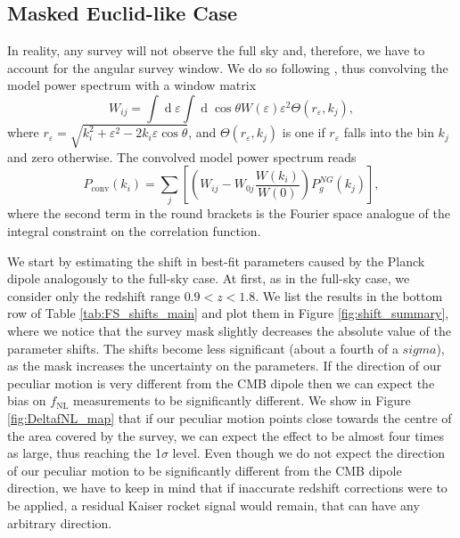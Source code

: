 \documentclass[a4paper,11pt]{article}
\renewcommand{\d}{\operatorname{d}}
\begin{document}
\subsection{Masked Euclid-like Case}
In reality, any survey will not observe the full sky and, therefore, we have to account for the angular survey window. We do so following \cite{Ross:2012sx}, thus convolving the model power spectrum with a window matrix 
\begin{equation}
    W_{ij} = \int\d\varepsilon\int\d\cos\theta W(\varepsilon)\varepsilon^2 \Theta(r_\varepsilon, k_j ),
\end{equation}
where $r_\varepsilon=\sqrt{k_i^2+\varepsilon^2-2k_i\varepsilon\cos\theta}$, and $\Theta(r_\varepsilon, k_j )$ is one if $r_\varepsilon$ falls into the bin $k_j$ and zero otherwise. The convolved model power spectrum reads
\begin{equation}
    P_\mathrm{conv}(k_i)=\sum_j \left[\left(W_{ij}-W_{0j}\frac{W(k_i)}{W(0)} \right)P_g^{NG}(k_j)\right],
\end{equation}
where the second term in the round brackets is the Fourier space analogue of the integral constraint on the correlation function.

We start by estimating the shift in best-fit parameters caused by the Planck dipole analogously to the full-sky case. At first, as in the full-sky case, we consider only the redshift range $0.9<z<1.8$. We list the results in the bottom row of Table \ref{tab:FS_shifts_main} and plot them in Figure \ref{fig:shift_summary}, where we  notice that the survey mask slightly decreases the absolute value of the parameter shifts. The shifts become less significant (about a fourth of a $sigma$), as the mask increases the uncertainty on the parameters.  
If the direction of our peculiar motion is very different from the CMB dipole then we can expect the bias on $f_\mathrm{NL}$ measurements to be significantly different. We show in Figure \ref{fig:DeltafNL_map} that if our peculiar motion points close towards the centre of the area covered by the survey, we can expect the effect  to be almost four times as large, thus reaching the 1$\sigma$ level. Even though we do not expect the direction of our peculiar motion to be significantly different from the CMB dipole direction, we have to keep in mind that if inaccurate redshift corrections were to  be applied,  a residual Kaiser rocket signal would remain,  that can have any arbitrary direction.
\end{document}
